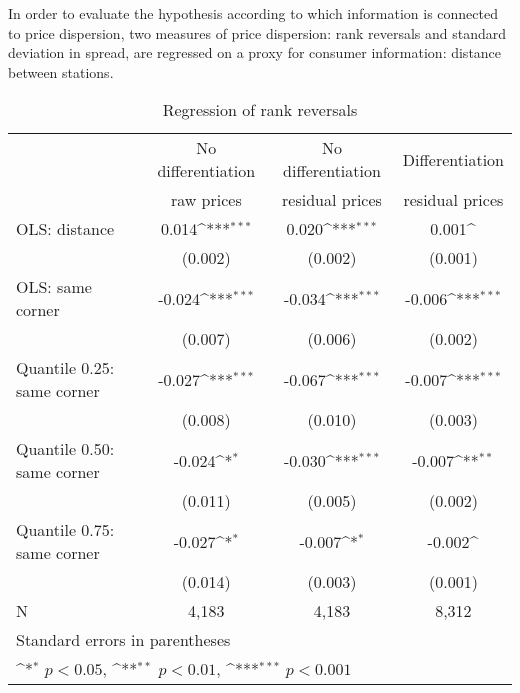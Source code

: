 \documentclass[english]{article}
\begin{document}
{{In order to evaluate the hypothesis according to which information is connected to price dispersion, two measures of price dispersion: rank reversals and standard deviation in spread, are regressed on a proxy for consumer information: distance between stations.

\begin{table}[H]
\centering
\def\sym#1{\ifmmode^{#1}\else\(^{#1}\)\fi}
\caption{Regression of rank reversals}
\begin{tabular}{lccc}
\hline
\hline
{} & No differentiation & No differentiation & Differentiation \\
{} & raw prices & residual prices & residual prices \\
\hline
OLS: distance             &  0.014\sym{***}  &  0.020\sym{***}  &  0.001\sym{}\\
{}                        & (0.002)          & (0.002)          & (0.001)   \\
OLS: same corner                & -0.024\sym{***}  & -0.034\sym{***}  & -0.006\sym{***}\\
{}                        & (0.007)          & (0.006)          & (0.002) \\
Quantile 0.25: same corner      & -0.027\sym{***}  & -0.067\sym{***}  & -0.007\sym{***}\\
{}                        & (0.008)          & (0.010)          & (0.003)  \\
Quantile 0.50: same corner      & -0.024\sym{*}    & -0.030\sym{***}  & -0.007\sym{**}\\
{}                        & (0.011)          & (0.005)          & (0.002)    \\
Quantile 0.75: same corner      & -0.027\sym{*}    & -0.007\sym{*}    & -0.002\sym{}\\
{}                        & (0.014)          & (0.003)          & (0.001)   \\
\hline
N                         & 4,183            &   4,183          &     8,312    \\
\hline\hline
\multicolumn{4}{l}{\footnotesize Standard errors in parentheses}\\
\multicolumn{4}{l}{\footnotesize \sym{*} \(p<0.05\), \sym{**} \(p<0.01\), \sym{***} \(p<0.001\)}\\
\end{tabular}
\\
\end{table}

}}
\end{document}
